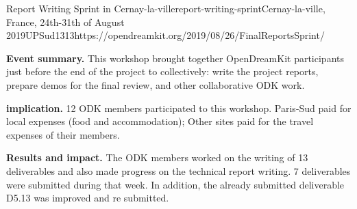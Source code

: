 \begin{event}{Report Writing Sprint in Cernay-la-ville}{report-writing-sprint}{Cernay-la-ville, France, 24th-31th of August 2019}{UPSud}{13}{13}{https://opendreamkit.org/2019/08/26/FinalReportsSprint/}

  \textbf{Event summary.} This workshop brought together OpenDreamKit
  participants just before the end of the project to collectively:
  write the project reports, prepare demos for the final review, and
  other collaborative ODK work.

  \textbf{\ODK implication.} 12 ODK members participated to this
  workshop. Paris-Sud paid for local expenses (food and
  accommodation); Other sites paid for the travel expenses of their
  members.

  \textbf{Results and impact.} The ODK members worked on the writing
  of 13 deliverables and also made progress on the technical report
  writing. 7 deliverables were submitted during that week. In
  addition, the already submitted deliverable D5.13 was improved and
  re submitted.
\end{event}
